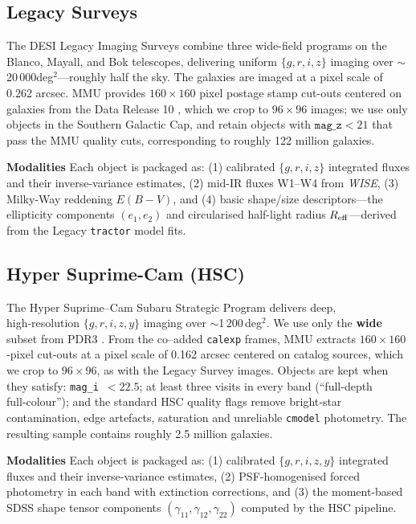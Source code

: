\documentclass[]{polymathic}
\begin{document}
\subsection{Legacy Surveys}
\label{sec:data:ls}
The DESI Legacy Imaging Surveys combine three wide-field programs on the Blanco, Mayall, and Bok telescopes, delivering uniform \mbox{$\{g,r,i,z\}$} imaging over $\sim$20\,000deg$^{2}$—roughly half the sky. The galaxies are imaged at a pixel scale of 0.262 arcsec. MMU provides $160\!\times\!160$ pixel postage stamp cut-outs centered on galaxies from the Data Release 10 \citep{dey2019overview}, which we crop to $96\!\times\!96$ images; we use only objects in the Southern Galactic Cap, and retain objects with $\texttt{mag\_z} < 21$ that pass the MMU quality cuts, corresponding to roughly 122 million galaxies. 

\textbf{Modalities} Each object is packaged as: 
(1) calibrated \mbox{$\{g,r,i,z\}$} integrated fluxes and their inverse-variance estimates,  
(2) mid-IR fluxes W1–W4 from \emph{WISE},  
(3) Milky-Way reddening $E(B{-}V)$, and  
(4) basic shape/size descriptors—the ellipticity components $(e_{1},e_{2})$ and circularised half-light radius $R_{\rm eff}$—derived from the Legacy \texttt{tractor} model fits.


\subsection{Hyper Suprime-Cam (HSC)}
\label{sec:data:hsc}
The Hyper Suprime–Cam Subaru Strategic Program delivers deep, high‑resolution $\{g,r,i,z,y\}$ imaging over $\sim$1\,200\,deg$^{2}$. We use only the \textbf{wide} subset from PDR3 \citep{aihara2018hyper}. From the co–added \texttt{calexp} frames, MMU extracts $160\!\times\!160$‑pixel cut-outs at a pixel scale of 0.162 arcsec centered on catalog sources, which we crop to $96 \times 96$, as with the Legacy Survey images. Objects are kept when they satisfy: \texttt{mag\_i}~$<22.5$; at least three visits in every band (``full‑depth full‑colour''); and the standard HSC quality flags remove bright‑star contamination, edge artefacts, saturation and unreliable \texttt{cmodel} photometry. The resulting sample contains roughly 2.5 million galaxies.

\textbf{Modalities} Each object is packaged as: 
(1) calibrated \mbox{$\{g,r,i,z,y\}$} integrated fluxes and their inverse-variance estimates, 
(2) PSF-homogenised forced photometry in each band with extinction corrections, and  
(3) the moment-based SDSS shape tensor components $(\gamma_{11},\gamma_{12},\gamma_{22})$ computed by the HSC pipeline.
\end{document}
